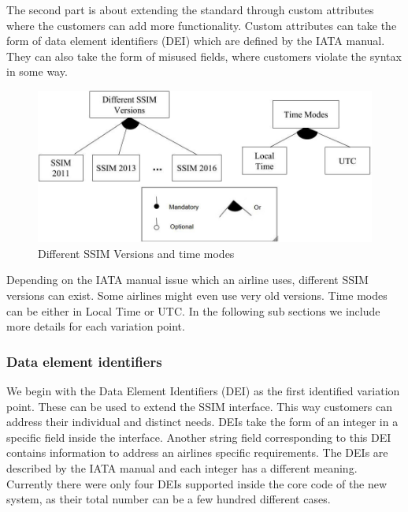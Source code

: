 The second part is about extending the standard through custom attributes where the customers can add more functionality.  Custom attributes can take the form of data element identifiers (DEI) which are defined by the IATA manual. They can also take the form of misused fields, where customers violate the syntax in some way.


\begin{figure}[h]
\centering
\includegraphics[width=\columnwidth]{figure/figure13.png}
\caption{ Different SSIM Versions and time modes}
\label{fig:SSIM}
\end{figure}



Depending on the IATA manual issue which an airline uses, different SSIM versions can exist. Some airlines might even use very old versions. 
Time modes can be either in Local Time or UTC. In the following sub sections we include more details for each variation point.


\subsubsection{Data element identifiers }
We begin with the Data Element Identifiers (DEI) as the first identified variation point. These can be used to extend the SSIM interface. This way customers can address their individual and distinct needs. DEIs take the form of an integer in a specific field inside the interface. Another string field corresponding to this DEI contains information to address an airlines specific requirements. The DEIs are described by the IATA manual and each integer has a different meaning. Currently there were only four DEIs supported inside the core code of the new system, as their total number can be a few hundred different cases. 


